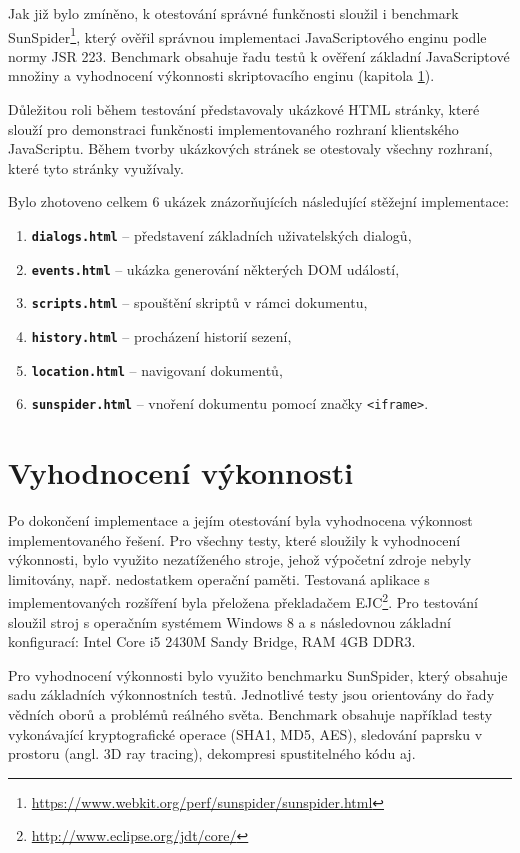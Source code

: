 Jak již bylo zmíněno, k otestování správné funkčnosti sloužil i benchmark SunSpider\footnote{\url{https://www.webkit.org/perf/sunspider/sunspider.html}}, který ověřil správnou implementaci JavaScriptového enginu podle normy JSR 223. Benchmark obsahuje řadu testů k ověření základní JavaScriptové množiny a vyhodnocení výkonnosti skriptovacího enginu (kapitola \ref{Chapter.Performance}).

Důležitou roli během testování představovaly ukázkové HTML stránky, které slouží pro demonstraci funkčnosti implementovaného rozhraní klientského JavaScriptu. Během tvorby ukázkových stránek se otestovaly všechny rozhraní, které tyto stránky využívaly. 

\bigskip \noindent Bylo zhotoveno celkem 6 ukázek znázorňujících následující stěžejní implementace:

\begin{enumerate}
  \item \textbf{\texttt{dialogs.html}} -- představení základních uživatelských dialogů,
  \item \textbf{\texttt{events.html}} -- ukázka generování některých DOM událostí,
  \item \textbf{\texttt{scripts.html}} -- spouštění skriptů v rámci dokumentu,
  \item \textbf{\texttt{history.html}} -- procházení historií sezení,
  \item \textbf{\texttt{location.html}} -- navigovaní dokumentů,
  \item \textbf{\texttt{sunspider.html}} -- vnoření dokumentu pomocí značky \texttt{<iframe>}.
\end{enumerate}

\section{Vyhodnocení výkonnosti}
\label{Chapter.Performance}

Po dokončení implementace a jejím otestování byla vyhodnocena výkonnost implementovaného řešení. Pro všechny testy, které sloužily k vyhodnocení výkonnosti, bylo využito nezatíženého stroje, jehož výpočetní zdroje nebyly limitovány, např. nedostatkem operační paměti. Testovaná aplikace s implementovaných rozšíření byla přeložena překladačem EJC\footnote{\url{http://www.eclipse.org/jdt/core/}}. Pro testování sloužil stroj s operačním systémem Windows 8 a s následovnou základní konfigurací: Intel Core i5 2430M Sandy Bridge, RAM 4GB DDR3.

Pro vyhodnocení výkonnosti bylo využito benchmarku SunSpider, který obsahuje sadu základních výkonnostních testů. Jednotlivé testy jsou orientovány do řady vědních oborů a problémů reálného světa. Benchmark obsahuje například testy vykonávající kryptografické operace (SHA1, MD5, AES), sledování paprsku v prostoru (angl. 3D ray tracing), dekompresi spustitelného kódu aj.

